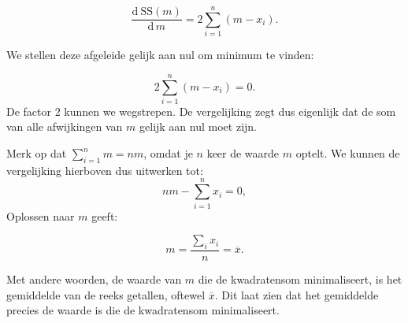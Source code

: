 \documentclass[
  a4paper,
]{scrbook}
\theoremstyle{definition}
\theoremstyle{definition}
\theoremstyle{remark}
\begin{document}
\[
    \frac{\mathrm{d}\,^{}\mathrm{SS}(m)}{\mathrm{d}\,m^{}} = 2 \sum_{i=1}^n (m - x_i).
\]

We stellen deze afgeleide gelijk aan nul om minimum te vinden:

\[
2 \sum_{i=1}^n (m - x_i) = 0.
\] De factor 2 kunnen we wegstrepen. De vergelijking zegt dus eigenlijk
dat de som van alle afwijkingen van \(m\) gelijk aan nul moet zijn.

Merk op dat \(\sum_{i=1}^n m = n m\), omdat je \(n\) keer de waarde
\(m\) optelt. We kunnen de vergelijking hierboven dus uitwerken tot: \[
n m - \sum_{i=1}^n x_i = 0,
\] Oplossen naar \(m\) geeft:

\[
m = \frac{\sum_i x_i}{n} = \overline{x}.
\]

Met andere woorden, de waarde van \(m\) die de kwadratensom
minimaliseert, is het gemiddelde van de reeks getallen, oftewel
\(\overline{x}\). Dit laat zien dat het gemiddelde precies de waarde is
die de kwadratensom minimaliseert.


\backmatter
\end{document}
